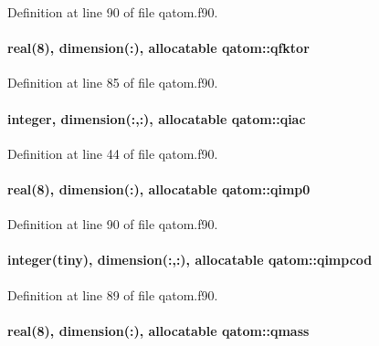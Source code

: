 Definition at line 90 of file qatom.\-f90.

\hypertarget{classqatom_a9d161240de494aa5e3246b9e57a600bc}{
\paragraph[{qfktor}]{\setlength{\rightskip}{0pt plus 5cm}real(8), dimension(\-:), allocatable qatom\-::qfktor}}\label{classqatom_a9d161240de494aa5e3246b9e57a600bc}


Definition at line 85 of file qatom.\-f90.

\hypertarget{classqatom_a98b6c947f4fc7a3f0eb6d5c3120def21}{
\paragraph[{qiac}]{\setlength{\rightskip}{0pt plus 5cm}integer, dimension(\-:,\-:), allocatable qatom\-::qiac}}\label{classqatom_a98b6c947f4fc7a3f0eb6d5c3120def21}


Definition at line 44 of file qatom.\-f90.

\hypertarget{classqatom_ab74e49ee8c35e3aa9ddebdcb7177b382}{
\paragraph[{qimp0}]{\setlength{\rightskip}{0pt plus 5cm}real(8), dimension(\-:), allocatable qatom\-::qimp0}}\label{classqatom_ab74e49ee8c35e3aa9ddebdcb7177b382}


Definition at line 90 of file qatom.\-f90.

\hypertarget{classqatom_ae79130031f46f5c006af90af79bdd169}{
\paragraph[{qimpcod}]{\setlength{\rightskip}{0pt plus 5cm}integer(tiny), dimension(\-:,\-:), allocatable qatom\-::qimpcod}}\label{classqatom_ae79130031f46f5c006af90af79bdd169}


Definition at line 89 of file qatom.\-f90.

\hypertarget{classqatom_a501fb9488ebd37b0d1b650f9a72fd58e}{
\paragraph[{qmass}]{\setlength{\rightskip}{0pt plus 5cm}real(8), dimension(\-:), allocatable qatom\-::qmass}}\label{classqatom_a501fb9488ebd37b0d1b650f9a72fd58e}


